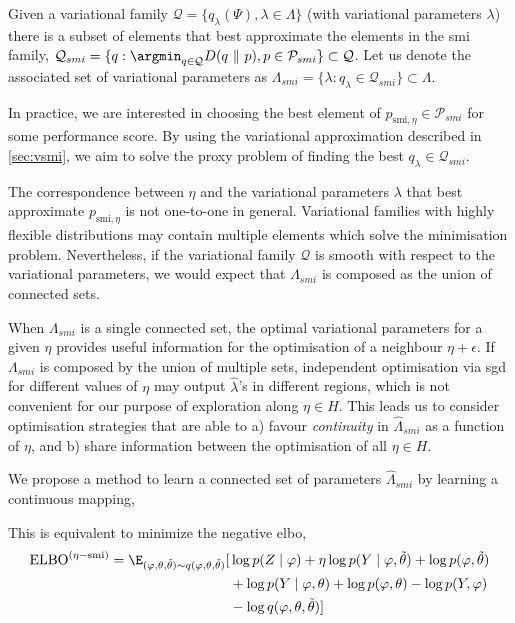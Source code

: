 Given a variational family $\mathcal{Q}=\{q_{\lambda}(\Psi), \lambda \in \Lambda\}$ (with variational parameters $\lambda$) there is a subset of elements that best approximate the elements in the \acrshort*{smi} family, $\mathcal{Q}_{smi} = \{ q: \argmin_{q \in \mathcal{Q}} D(q{\,{\,\|\,}\,} p) , p \in \mathcal{P}_{smi} \} \subset \mathcal{Q}$.
Let us denote the associated set of variational parameters as $\Lambda_{smi}=\{ \lambda : q_{\lambda} \in \mathcal{Q}_{smi} \} \subset \Lambda$.

In practice, we are interested in choosing the best element of $p_{ \text{smi}, \eta} \in \mathcal{P}_{smi}$ for some performance score.
By using the variational approximation described in \cref{sec:vsmi}, we aim to solve the proxy problem of finding the best $q_{\lambda} \in \mathcal{Q}_{smi}$.

The correspondence between $\eta$ and the variational parameters $\lambda$ that best approximate $p_{ \text{smi}, \eta}$ is not one-to-one in general.
Variational families with highly flexible distributions may contain multiple elements which solve the minimisation problem.
Nevertheless, if the variational family $\mathcal{Q}$ is smooth with respect to the variational parameters, we would expect that $\Lambda_{smi}$ is composed as the union of connected sets.

When $\Lambda_{smi}$ is a single connected set, the optimal variational parameters for a given $\eta$ provides useful information for the optimisation of a neighbour $\eta+\epsilon$.
If $\Lambda_{smi}$ is composed by the union of multiple sets, independent optimisation via \acrshort*{sgd} for different values of $\eta$ may output $\hat\lambda$'s in different regions, which is not convenient for our purpose of exploration along $\eta\in H$.
This leads us to consider optimisation strategies that are able to a) favour \emph{continuity} in $\hat\Lambda_{smi}$ as a function of $\eta$, and b) share information between the optimisation of all $\eta \in H$.

We propose a method to learn a connected set of parameters $\hat\Lambda_{smi}$ by learning a continuous mapping,

This is equivalent to minimize the negative \acrshort*{elbo},
\begin{align}
  \text{ELBO}^{(\eta-\text{smi})} = \E_{(\varphi, \theta, \tilde\theta) \sim q(\varphi, \theta, \tilde\theta)}[ & \log p(Z \mid \varphi) + \eta \log p(Y \mid \varphi, \tilde\theta) + \log p(\varphi, \tilde\theta) \nonumber \\
                                                                                                                & + \log p(Y \mid \varphi, \theta) + \log p(\varphi, \theta) - \log p(Y, \varphi) \nonumber                    \\
                                                                                                                & - \log q(\varphi, \theta, \tilde\theta) ]
\end{align}


